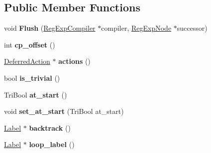 \subsection*{Public Member Functions}
\begin{DoxyCompactItemize}
\item 
void {\bfseries Flush} (\hyperlink{classv8_1_1internal_1_1_reg_exp_compiler}{Reg\+Exp\+Compiler} $\ast$compiler, \hyperlink{classv8_1_1internal_1_1_reg_exp_node}{Reg\+Exp\+Node} $\ast$successor)\hypertarget{classv8_1_1internal_1_1_trace_a1bd6080f97b33251cd6e8c3ad8f5ead3}{}\label{classv8_1_1internal_1_1_trace_a1bd6080f97b33251cd6e8c3ad8f5ead3}

\item 
int {\bfseries cp\+\_\+offset} ()\hypertarget{classv8_1_1internal_1_1_trace_a9cb9dd697dda62f3db7e9ec3ecd823df}{}\label{classv8_1_1internal_1_1_trace_a9cb9dd697dda62f3db7e9ec3ecd823df}

\item 
\hyperlink{classv8_1_1internal_1_1_trace_1_1_deferred_action}{Deferred\+Action} $\ast$ {\bfseries actions} ()\hypertarget{classv8_1_1internal_1_1_trace_a7c53de86842d2c338b9302386d5cbacd}{}\label{classv8_1_1internal_1_1_trace_a7c53de86842d2c338b9302386d5cbacd}

\item 
bool {\bfseries is\+\_\+trivial} ()\hypertarget{classv8_1_1internal_1_1_trace_a6f3ce5f13fa43ca8e437a872deca5d40}{}\label{classv8_1_1internal_1_1_trace_a6f3ce5f13fa43ca8e437a872deca5d40}

\item 
Tri\+Bool {\bfseries at\+\_\+start} ()\hypertarget{classv8_1_1internal_1_1_trace_a5f204f16aa287881fd2f0f310094a647}{}\label{classv8_1_1internal_1_1_trace_a5f204f16aa287881fd2f0f310094a647}

\item 
void {\bfseries set\+\_\+at\+\_\+start} (Tri\+Bool at\+\_\+start)\hypertarget{classv8_1_1internal_1_1_trace_a35e88e274974fe1df70db67b9e3a2dc7}{}\label{classv8_1_1internal_1_1_trace_a35e88e274974fe1df70db67b9e3a2dc7}

\item 
\hyperlink{classv8_1_1internal_1_1_label}{Label} $\ast$ {\bfseries backtrack} ()\hypertarget{classv8_1_1internal_1_1_trace_ab4b78fba6c18060801cff3302ad759f2}{}\label{classv8_1_1internal_1_1_trace_ab4b78fba6c18060801cff3302ad759f2}

\item 
\hyperlink{classv8_1_1internal_1_1_label}{Label} $\ast$ {\bfseries loop\+\_\+label} ()\hypertarget{classv8_1_1internal_1_1_trace_a63ab79cbd87d9713d91e895eb564d986}{}\label{classv8_1_1internal_1_1_trace_a63ab79cbd87d9713d91e895eb564d986}


\end{DoxyCompactItemize}
